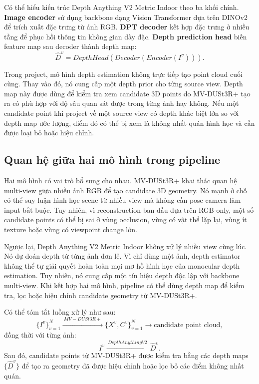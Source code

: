 \documentclass[12pt,a4paper]{article}
\newcommand{\mvdp}{MV-DUSt3R+}
\newcommand{\da}{Depth Anything V2}
\begin{document}
Có thể hiểu kiến trúc \da{} Metric Indoor theo ba khối chính. \textbf{Image encoder} sử dụng backbone dạng Vision Transformer dựa trên DINOv2 để trích xuất đặc trưng từ ảnh RGB. \textbf{DPT decoder} kết hợp đặc trưng ở nhiều tầng để phục hồi thông tin không gian dày đặc. \textbf{Depth prediction head} biến feature map sau decoder thành depth map:
\begin{equation}
\hat{D}^{v}=DepthHead(Decoder(Encoder(I^v))).
\end{equation}

Trong project, mô hình depth estimation không trực tiếp tạo point cloud cuối cùng. Thay vào đó, nó cung cấp một depth prior cho từng source view. Depth map này được dùng để kiểm tra xem candidate 3D points do \mvdp{} tạo ra có phù hợp với độ sâu quan sát được trong từng ảnh hay không. Nếu một candidate point khi project về một source view có depth khác biệt lớn so với depth map ước lượng, điểm đó có thể bị xem là không nhất quán hình học và cần được loại bỏ hoặc hiệu chỉnh.

\subsection{Quan hệ giữa hai mô hình trong pipeline}
Hai mô hình có vai trò bổ sung cho nhau. \mvdp{} khai thác quan hệ multi-view giữa nhiều ảnh RGB để tạo candidate 3D geometry. Nó mạnh ở chỗ có thể suy luận hình học scene từ nhiều view mà không cần pose camera làm input bắt buộc. Tuy nhiên, vì reconstruction ban đầu dựa trên RGB-only, một số candidate points có thể bị sai ở vùng occlusion, vùng có vật thể lặp lại, vùng ít texture hoặc vùng có viewpoint change lớn.

Ngược lại, \da{} Metric Indoor không xử lý nhiều view cùng lúc. Nó dự đoán depth từ từng ảnh đơn lẻ. Vì chỉ dùng một ảnh, depth estimator không thể tự giải quyết hoàn toàn mọi mơ hồ hình học của monocular depth estimation. Tuy nhiên, nó cung cấp một tín hiệu depth độc lập với backbone multi-view. Khi kết hợp hai mô hình, pipeline có thể dùng depth map để kiểm tra, lọc hoặc hiệu chỉnh candidate geometry từ \mvdp{}.

Có thể tóm tắt luồng xử lý như sau:
\begin{equation}
\{I^v\}_{v=1}^{N}\xrightarrow{\ \mvdp{}\ }\{X^v,C^v\}_{v=1}^{N}\xrightarrow{}\text{candidate point cloud},
\end{equation}
đồng thời với từng ảnh:
\begin{equation}
I^v\xrightarrow{\ \da{}\ }\hat{D}^{v}.
\end{equation}
Sau đó, candidate points từ \mvdp{} được kiểm tra bằng các depth maps $\{\hat{D}^{v}\}$ để tạo ra geometry đã được hiệu chỉnh hoặc lọc bỏ các điểm không nhất quán.
\end{document}
